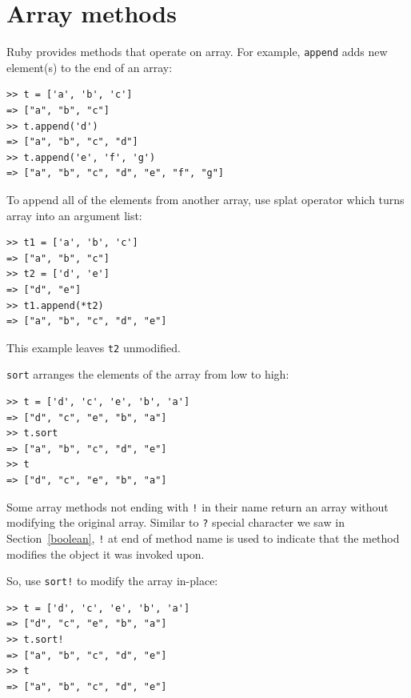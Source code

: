 \documentclass[10pt]{book}
\begin{document}
%


\section{Array methods}

Ruby provides methods that operate on array.  For example,
{\tt append} adds new element(s) to the end of an array:

\begin{verbatim}
>> t = ['a', 'b', 'c']
=> ["a", "b", "c"]
>> t.append('d')
=> ["a", "b", "c", "d"]
>> t.append('e', 'f', 'g')
=> ["a", "b", "c", "d", "e", "f", "g"]
\end{verbatim}
%
To append all of the elements from another array, use
splat operator {\tt *} which turns array into an argument list:

\begin{verbatim}
>> t1 = ['a', 'b', 'c']
=> ["a", "b", "c"]
>> t2 = ['d', 'e']
=> ["d", "e"]
>> t1.append(*t2)
=> ["a", "b", "c", "d", "e"]
\end{verbatim}
%
This example leaves {\tt t2} unmodified.

{\tt sort} arranges the elements of the array from low to high:

\begin{verbatim}
>> t = ['d', 'c', 'e', 'b', 'a']
=> ["d", "c", "e", "b", "a"]
>> t.sort
=> ["a", "b", "c", "d", "e"]
>> t
=> ["d", "c", "e", "b", "a"]
\end{verbatim}
%
Some array methods not ending with {\tt !} in their name
return an array without modifying the original array.
Similar to {\tt ?} special character we saw in Section~\ref{boolean},
{\tt !} at end of method name is used to indicate that the method modifies
the object it was invoked upon. 

So, use {\tt sort!} to modify the array in-place:

\begin{verbatim}
>> t = ['d', 'c', 'e', 'b', 'a']
=> ["d", "c", "e", "b", "a"]
>> t.sort!
=> ["a", "b", "c", "d", "e"]
>> t
=> ["a", "b", "c", "d", "e"]
\end{verbatim}
\end{document}
